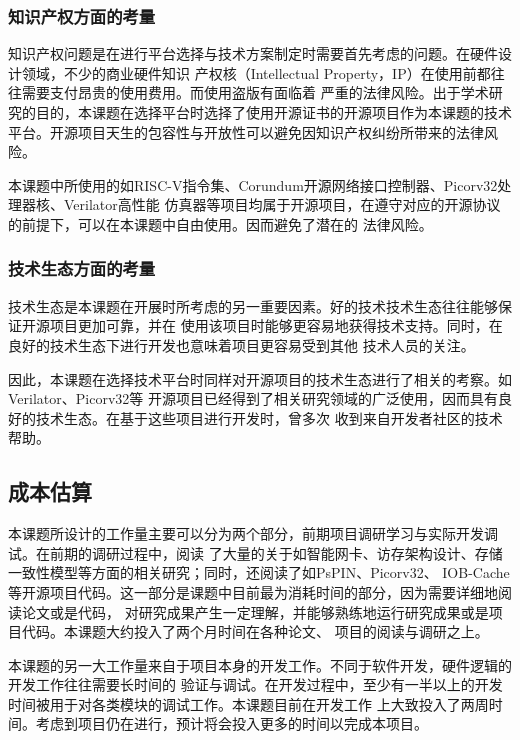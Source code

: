 \subsubsection{知识产权方面的考量}

知识产权问题是在进行平台选择与技术方案制定时需要首先考虑的问题。在硬件设计领域，不少的商业硬件知识
产权核（Intellectual Property，IP）在使用前都往往需要支付昂贵的使用费用。而使用盗版有面临着
严重的法律风险。出于学术研究的目的，本课题在选择平台时选择了使用开源证书的开源项目作为本课题的技术
平台。开源项目天生的包容性与开放性可以避免因知识产权纠纷所带来的法律风险。

本课题中所使用的如RISC-V指令集、Corundum开源网络接口控制器、Picorv32处理器核、Verilator高性能
仿真器等项目均属于开源项目，在遵守对应的开源协议的前提下，可以在本课题中自由使用。因而避免了潜在的
法律风险。

\subsubsection{技术生态方面的考量}

技术生态是本课题在开展时所考虑的另一重要因素。好的技术技术生态往往能够保证开源项目更加可靠，并在
使用该项目时能够更容易地获得技术支持。同时，在良好的技术生态下进行开发也意味着项目更容易受到其他
技术人员的关注。

因此，本课题在选择技术平台时同样对开源项目的技术生态进行了相关的考察。如Verilator、Picorv32等
开源项目已经得到了相关研究领域的广泛使用，因而具有良好的技术生态。在基于这些项目进行开发时，曾多次
收到来自开发者社区的技术帮助。

\subsection{成本估算}


本课题所设计的工作量主要可以分为两个部分，前期项目调研学习与实际开发调试。在前期的调研过程中，阅读
了大量的关于如智能网卡、访存架构设计、存储一致性模型等方面的相关研究；同时，还阅读了如PsPIN、Picorv32、
IOB-Cache等开源项目代码。这一部分是课题中目前最为消耗时间的部分，因为需要详细地阅读论文或是代码，
对研究成果产生一定理解，并能够熟练地运行研究成果或是项目代码。本课题大约投入了两个月时间在各种论文、
项目的阅读与调研之上。

本课题的另一大工作量来自于项目本身的开发工作。不同于软件开发，硬件逻辑的开发工作往往需要长时间的
验证与调试。在开发过程中，至少有一半以上的开发时间被用于对各类模块的调试工作。本课题目前在开发工作
上大致投入了两周时间。考虑到项目仍在进行，预计将会投入更多的时间以完成本项目。

